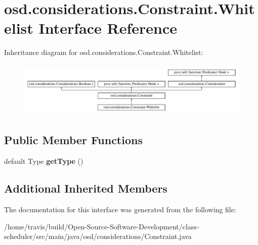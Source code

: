 \hypertarget{interfaceosd_1_1considerations_1_1_constraint_1_1_whitelist}{\section{osd.\-considerations.\-Constraint.\-Whitelist Interface Reference}
\label{interfaceosd_1_1considerations_1_1_constraint_1_1_whitelist}
}
Inheritance diagram for osd.\-considerations.\-Constraint.\-Whitelist\-:\begin{figure}[H]
\begin{center}
\leavevmode
\includegraphics[height=2.685851cm]{interfaceosd_1_1considerations_1_1_constraint_1_1_whitelist}
\end{center}
\end{figure}
\subsection*{Public Member Functions}
\begin{DoxyCompactItemize}
\item 
\hypertarget{interfaceosd_1_1considerations_1_1_constraint_1_1_whitelist_a42fe7cf245fe854652d98af0f7f7d3e7}{default Type {\bfseries get\-Type} ()}\label{interfaceosd_1_1considerations_1_1_constraint_1_1_whitelist_a42fe7cf245fe854652d98af0f7f7d3e7}

\end{DoxyCompactItemize}
\subsection*{Additional Inherited Members}


The documentation for this interface was generated from the following file\-:\begin{DoxyCompactItemize}
\item 
/home/travis/build/\-Open-\/\-Source-\/\-Software-\/\-Development/class-\/scheduler/src/main/java/osd/considerations/Constraint.\-java\end{DoxyCompactItemize}
